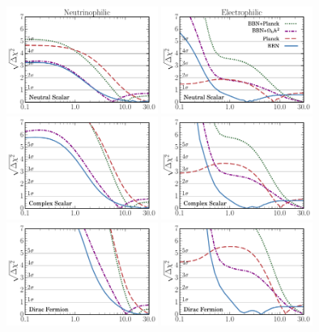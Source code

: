 \documentclass[notitlepage,letterpaper,natbib,aps,prd,onecolumn,amsmath,amsfonts,nofootinbib,preprintnumbers,superscriptaddress,secnumarabic,groupedaddress]{revtex4-1}
\begin{document}
\begin{figure}[t]
    \includegraphics[width=0.44\textwidth]{figures/Nu_Neutral_Scalar_sqrtchisq.pdf} \quad \includegraphics[width=0.44\textwidth]{figures/EE_Neutral_Scalar_sqrtchisq.pdf} \\  \includegraphics[width=0.44\textwidth]{figures/Nu_Complex_Scalar_sqrtchisq.pdf} \quad \includegraphics[width=0.44\textwidth]{figures/EE_Complex_Scalar_sqrtchisq.pdf} \\ \includegraphics[width=0.44\textwidth]{figures/Nu_Dirac_sqrtchisq.pdf} \quad \includegraphics[width=0.44\textwidth]{figures/EE_Dirac_sqrtchisq.pdf} \\ 

\end{figure}
\end{document}
